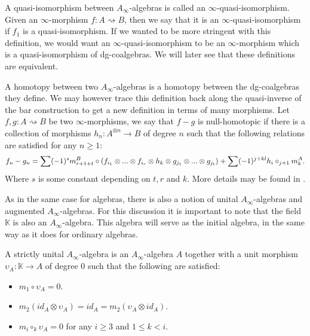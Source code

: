\documentclass[../thesis.tex]{subfiles}
\begin{document}
        A quasi-isomorphism between $A_\infty$-algebras is called an $\infty$-quasi-isomorphism. Given an $\infty$-morphism $f: A\rightsquigarrow B$, then we say that it is an $\infty$-quasi-isomorphism if $f_1$ is a quasi-isomorphism. If we wanted to be more stringent with this definition, we would want an $\infty$-quasi-isomorphism to be an $\infty$-morphism which is a quasi-isomorphism of dg-coalgebras. We will later see that these definitions are equivalent.

        A homotopy between two $A_\infty$-algebras is a homotopy between the dg-coalgebras they define. We may however trace this definition back along the quasi-inverse of the bar construction to get a new definition in terms of many morphisms.  Let $f,g: A\rightsquigarrow B$ be two $\infty$-morphisms, we say that $f-g$ is null-homotopic if there is a collection of morphisms $h_n : A^{\otimes n} \rightarrow B$ of degree $n$ such that the following relations are satisfied for any $n \geq 1$:
        \begin{multline*}
            f_n - g_n = \sum (-1)^s m^B_{r+1+t}\circ (f_{i_1}\otimes ... \otimes f_{i_r} \otimes h_k \otimes g_{j_1} \otimes ... \otimes g_{j_t}) +  \sum (-1)^{j+kl}h_i \circ_{j+1} m_k^A\tt{.}
        \end{multline*}
        Where $s$ is some constant depending on $t,r$ and $k$. More details may be found in \cite{LefevreHasegawa03}.

        As in the same case for algebras, there is also a notion of unital $A_\infty$-algebras and augmented $A_\infty$-algebras. For this discussion it is important to note that the field $\mathbb{K}$ is also an $A_\infty$-algebra. This algebra will serve as the initial algebra, in the same way as it does for ordinary algebras.

        \begin{definition}\label{def: strict-unit}
            A strictly unital $A_\infty$-algebra is an $A_\infty$-algebra $A$ together with a unit morphism $\upsilon_A : \mathbb{K} \rightarrow A$ of degree $0$ such that the following are satisfied:
            \begin{itemize}
                \item $m_1\circ \upsilon_A = 0$.
                \item $m_2(id_A \otimes \upsilon_A) = id_A = m_2(\upsilon_A\otimes id_A)$.
                \item $m_i \circ_k \upsilon_A = 0$ for any $i\geq 3$ and $1 \leq k < i$.
            \end{itemize}
        \end{definition}
\end{document}
